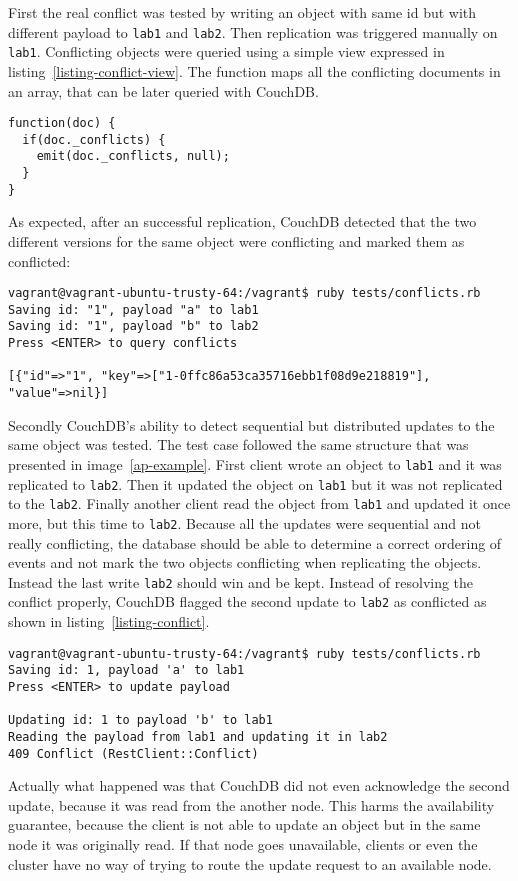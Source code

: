 First the real conflict was tested by writing an object with same id but with
different payload to \texttt{lab1} and \texttt{lab2}. Then replication was
triggered manually on \texttt{lab1}. Conflicting objects were queried using a
simple view expressed in listing~\ref{listing-conflict-view}. The function maps all the conflicting documents in an array, that can be later queried with CouchDB.

\begin{lstlisting}[caption=A view to query CouchDB
conflicts,label=listing-conflict-view]
function(doc) {
  if(doc._conflicts) {
    emit(doc._conflicts, null);
  }
}
\end{lstlisting}

As expected, after an successful replication, CouchDB detected that the two
different versions for the same object were conflicting and marked them as
conflicted:

\begin{lstlisting}
vagrant@vagrant-ubuntu-trusty-64:/vagrant$ ruby tests/conflicts.rb
Saving id: "1", payload "a" to lab1
Saving id: "1", payload "b" to lab2
Press <ENTER> to query conflicts

[{"id"=>"1", "key"=>["1-0ffc86a53ca35716ebb1f08d9e218819"], "value"=>nil}]
\end{lstlisting}

Secondly CouchDB's ability to detect sequential but distributed updates to the
same object was tested. The test case followed the same structure that was
presented in image~\ref{ap-example}. First client wrote an object to
\texttt{lab1} and it was replicated to \texttt{lab2}. Then it updated the
object on \texttt{lab1} but it was not replicated to the \texttt{lab2}. Finally
another client read the object from \texttt{lab1} and updated it once more, but
this time to \texttt{lab2}. Because all the updates were sequential and not
really conflicting, the database should be able to determine a correct ordering
of events and not mark the two objects conflicting when replicating the objects.
Instead the last write \texttt{lab2} should win and be kept. Instead of
resolving the conflict properly, CouchDB flagged the second update to
\texttt{lab2} as conflicted as shown in listing~\ref{listing-conflict}.

\begin{lstlisting}[caption=CouchDB detecting false positive conflict when updating the same object in different machines,label=listing-conflict]
vagrant@vagrant-ubuntu-trusty-64:/vagrant$ ruby tests/conflicts.rb
Saving id: 1, payload 'a' to lab1
Press <ENTER> to update payload

Updating id: 1 to payload 'b' to lab1
Reading the payload from lab1 and updating it in lab2
409 Conflict (RestClient::Conflict)
\end{lstlisting}

Actually what happened was that CouchDB did not even acknowledge the second
update, because it was read from the another node. This harms the
availability guarantee, because the client is not able to update an object but
in the same node it was originally read. If that node goes unavailable, clients
or even the cluster have no way of trying to route the update request to an
available node.
